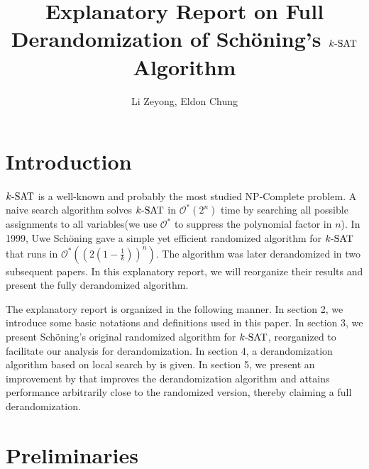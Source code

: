 \documentclass[a4paper,12pts]{article}
\title{Explanatory Report on Full Derandomization of Sch\"{o}ning's $\SAT$ Algorithm}
\author{Li Zeyong, Eldon Chung}
\date{}
\newcommand{\SAT}{\textnormal{$k$-SAT}}
\renewcommand{\O}{\mathcal{O}^*}
\begin{document}
\maketitle

\section{Introduction}
\paragraph{} $\SAT$ is a well-known and probably the most studied NP-Complete problem. A naive search algorithm solves $\SAT$ in $\O(2^n)$ time by searching all possible assignments to all variables(we use $\O$ to suppress the polynomial factor in $n$). In 1999, Uwe Sch\"{o}ning gave a simple yet efficient randomized algorithm for $\SAT$\cite{Schoning99} that runs in $\O((2(1-\frac{1}{k}))^n)$. The algorithm was later derandomized in two subsequent papers\cite{Dantsin02,Moser11}. In this explanatory report, we will reorganize their results and present the fully derandomized algorithm.\par 
The explanatory report is organized in the following manner. In section 2, we introduce some basic notations and definitions used in this paper. In section 3, we present Sch\"{o}ning's original randomized algorithm\cite{Schoning99} for $\SAT$, reorganized to facilitate our analysis for derandomization. In section 4, a derandomization algorithm based on local search by \cite{Dantsin02} is given. In section 5, we present an improvement by \cite{Moser11} that improves the derandomization algorithm and attains performance arbitrarily close to the randomized version, thereby claiming a full derandomization.

\section{Preliminaries}
\end{document}
